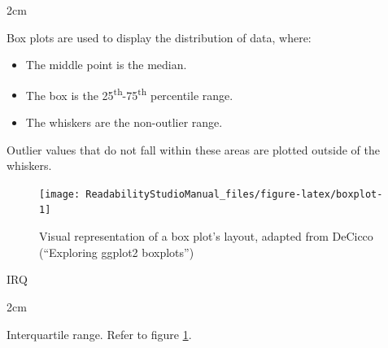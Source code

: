 \documentclass[
]{book}
\providecommand{\tightlist}{%
  \setlength{\itemsep}{0pt}\setlength{\parskip}{0pt}}
\newenvironment{glsentry}
  {
  \begin{minipage}{\textwidth}
  }
  {
  \end{minipage}
  }
\newenvironment{glsterm}
  {
  \bfseries
  }
  {
  }
\newenvironment{glsdef}
  {
  \noindent
  \flushleft
  \begin{adjustwidth}{2cm}{}
  }
  {
  \end{adjustwidth}
  }
\theoremstyle{definition}
\theoremstyle{definition}
\theoremstyle{definition}
\theoremstyle{definition}
\theoremstyle{remark}
\begin{document}
\begin{glsdef}

Box plots are used to display the distribution of data, where:

\begin{itemize}
\tightlist
\item
  The middle point is the median.
\item
  The box is the 25\textsuperscript{th}-75\textsuperscript{th} percentile range.
\item
  The whiskers are the non-outlier range.
\end{itemize}

Outlier values that do not fall within these areas are plotted outside of the whiskers.

\begin{figure}[H]

{\centering \texttt{[image: ReadabilityStudioManual\_files/figure-latex/boxplot-1]} 

}

\caption{Visual representation of a box plot's layout, adapted from DeCicco (“Exploring ggplot2 boxplots”)}\label{fig:boxplot}
\end{figure}

\end{glsdef}

\begin{glsentry}

\begin{glsterm}
IRQ

\end{glsterm}

\begin{glsdef}
Interquartile range. Refer to figure \ref{fig:boxplot}.

\end{glsdef}

\end{glsentry}
\end{document}
